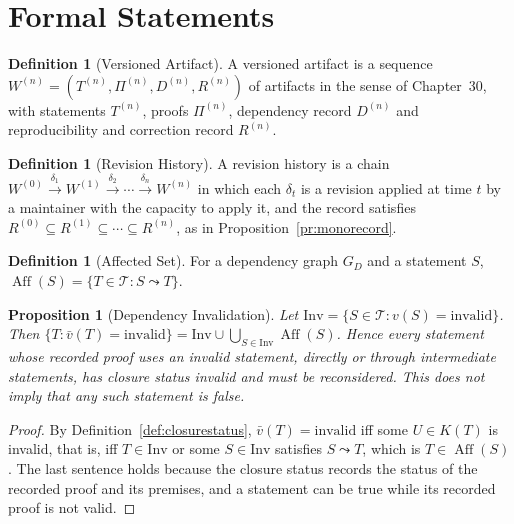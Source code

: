 \documentclass[11pt,letterpaper]{report}
\theoremstyle{plain}
\newtheorem{proposition}[theorem]{Proposition}
\theoremstyle{definition}
\newtheorem{definition}[theorem]{Definition}
\theoremstyle{remark}
\begin{document}
\section{Formal Statements}

\begin{definition}[Versioned Artifact]\label{def:versioned}
A versioned artifact is a sequence $W^{(n)}=(T^{(n)},\Pi^{(n)},D^{(n)},R^{(n)})$ of artifacts in the sense of Chapter~30, with statements $T^{(n)}$, proofs $\Pi^{(n)}$, dependency record $D^{(n)}$ and reproducibility and correction record $R^{(n)}$.
\end{definition}

\begin{definition}[Revision History]\label{def:history}
A revision history is a chain $W^{(0)}\xrightarrow{\delta_1}W^{(1)}\xrightarrow{\delta_2}\cdots\xrightarrow{\delta_n}W^{(n)}$ in which each $\delta_t$ is a revision applied at time $t$ by a maintainer with the capacity to apply it, and the record satisfies $R^{(0)}\subseteq R^{(1)}\subseteq\cdots\subseteq R^{(n)}$, as in Proposition~\ref{pr:monorecord}.
\end{definition}

\begin{definition}[Affected Set]\label{def:affected}
For a dependency graph $G_D$ and a statement $S$, $\operatorname{Aff}(S)=\{T\in\mathcal T:S\leadsto T\}$.
\end{definition}

\begin{proposition}[Dependency Invalidation]\label{pr:invalidation}
Let $\mathrm{Inv}=\{S\in\mathcal T:v(S)=\mathrm{invalid}\}$. Then $\{T:\bar v(T)=\mathrm{invalid}\}=\mathrm{Inv}\cup\bigcup_{S\in\mathrm{Inv}}\operatorname{Aff}(S)$. Hence every statement whose recorded proof uses an invalid statement, directly or through intermediate statements, has closure status invalid and must be reconsidered. This does not imply that any such statement is false.
\end{proposition}
\begin{proof}
By Definition~\ref{def:closurestatus}, $\bar v(T)=\mathrm{invalid}$ iff some $U\in K(T)$ is invalid, that is, iff $T\in\mathrm{Inv}$ or some $S\in\mathrm{Inv}$ satisfies $S\leadsto T$, which is $T\in\operatorname{Aff}(S)$. The last sentence holds because the closure status records the status of the recorded proof and its premises, and a statement can be true while its recorded proof is not valid.
\end{proof}
\end{document}
